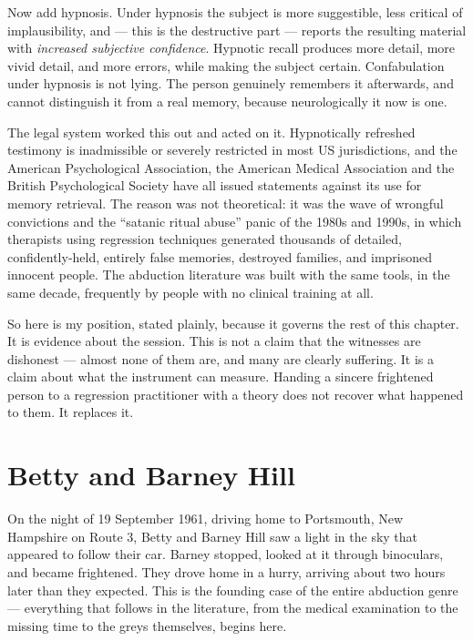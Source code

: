 Now add hypnosis. Under hypnosis the subject is more suggestible, less critical of
implausibility, and --- this is the destructive part --- reports the resulting material with
\emph{increased subjective confidence}. Hypnotic recall produces more detail, more vivid
detail, and more errors, while making the subject certain. Confabulation under hypnosis is
not lying. The person genuinely remembers it afterwards, and cannot distinguish it from a real
memory, because neurologically it now is one.

\begin{funfact}
The legal system worked this out and acted on it. Hypnotically refreshed testimony is
inadmissible or severely restricted in most US jurisdictions, and the American Psychological
Association, the American Medical Association and the British Psychological Society have all
issued statements against its use for memory retrieval. The reason was not theoretical: it was
the wave of wrongful convictions and the ``satanic ritual abuse'' panic of the 1980s and
1990s, in which therapists using regression techniques generated thousands of detailed,
confidently-held, entirely false memories, destroyed families, and imprisoned innocent people.
The abduction literature was built with the same tools, in the same decade, frequently by
people with no clinical training at all.
\end{funfact}

So here is my position, stated plainly, because it governs the rest of this chapter.  It is
evidence about the session. This is not a claim that the witnesses are dishonest --- almost
none of them are, and many are clearly suffering. It is a claim about what the instrument can
measure. Handing a sincere frightened person to a regression practitioner with a theory does
not recover what happened to them. It replaces it.

\section{Betty and Barney Hill}\label{sec:bettybarneyhill}

On the night of 19 September 1961, driving home to Portsmouth, New Hampshire on Route 3, Betty
and Barney Hill saw a light in the sky that appeared to follow their car. Barney stopped,
looked at it through binoculars, and became frightened. They drove home in a hurry, arriving
about two hours later than they expected. This is the founding case of the entire abduction
genre --- everything that follows in the literature, from the medical examination to the
missing time to the greys themselves, begins here.

